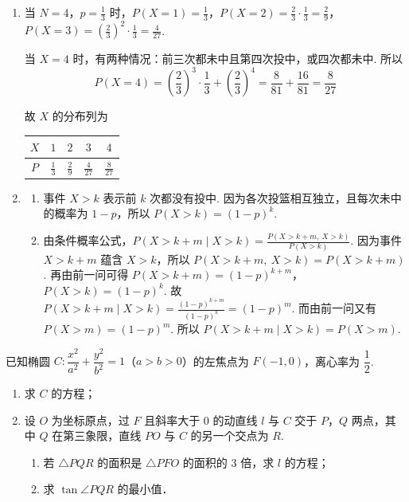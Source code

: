\documentclass[UTF8,a4paper,oneside,11pt]{ctexbook}
\begin{document}
\begin{solution}
\begin{enumerate}
\item 当 \(N=4\)，\(p=\frac{1}{3}\) 时，\(P\left( X=1 \right)=\frac{1}{3}\)，\(P\left( X=2 \right)=\frac{2}{3}\cdot \frac{1}{3}=\frac{2}{9}\)，\(P\left( X=3 \right)=\left( \frac{2}{3} \right)^2\cdot \frac{1}{3}=\frac{4}{27}\).

当 \(X=4\) 时，有两种情况：前三次都未中且第四次投中，或四次都未中. 所以
\[
P\left( X=4 \right)=\left( \frac{2}{3} \right)^3\cdot \frac{1}{3}+\left( \frac{2}{3} \right)^4=\frac{8}{81}+\frac{16}{81}=\frac{8}{27}
\]

故 \(X\) 的分布列为
{\centering
\begin{tabular}{c|cccc}
\(X\) & \(1\) & \(2\) & \(3\) & \(4\) \\
\hline
\(P\) & \(\frac{1}{3}\) & \(\frac{2}{9}\) & \(\frac{4}{27}\) & \(\frac{8}{27}\)
\end{tabular}
\par}

\item
\begin{enumerate}
\item 事件 \(X>k\) 表示前 \(k\) 次都没有投中. 因为各次投篮相互独立，且每次未中的概率为 \(1-p\)，所以 \(P\left( X>k \right)=\left( 1-p \right)^k\).

\item 由条件概率公式，\(P\left( X>k+m\mid X>k \right)=\frac{P\left( X>k+m,\ X>k \right)}{P\left( X>k \right)}\). 因为事件 \(X>k+m\) 蕴含 \(X>k\)，所以 \(P\left( X>k+m,\ X>k \right)=P\left( X>k+m \right)\). 再由前一问可得 \(P\left( X>k+m \right)=\left( 1-p \right)^{k+m}\)，\(P\left( X>k \right)=\left( 1-p \right)^k\). 故 \(P\left( X>k+m\mid X>k \right)=\frac{\left( 1-p \right)^{k+m}}{\left( 1-p \right)^k}=\left( 1-p \right)^m\). 而由前一问又有 \(P\left( X>m \right)=\left( 1-p \right)^m\). 所以 \(P\left( X>k+m\mid X>k \right)=P\left( X>m \right)\).
\end{enumerate}
\end{enumerate}
\end{solution}

\begin{problem}
已知椭圆 \(C:\dfrac{x^2}{a^2}+\dfrac{y^2}{b^2}=1\)（\(a>b>0\)）的左焦点为 \(F(-1,0)\)，离心率为 \(\dfrac{1}{2}\).

\begin{enumerate}
\item 求 \(C\) 的方程；
\item 设 \(O\) 为坐标原点，过 \(F\) 且斜率大于 \(0\) 的动直线 \(l\) 与 \(C\) 交于 \(P\)，\(Q\) 两点，其中 \(Q\) 在第三象限，直线 \(PO\) 与 \(C\) 的另一个交点为 \(R\).
\begin{enumerate}
\item 若 \(\triangle PQR\) 的面积是 \(\triangle PFO\) 的面积的 \(3\) 倍，求 \(l\) 的方程；
\item 求 \(\tan \angle PQR\) 的最小值．
\end{enumerate}
\end{enumerate}
\end{problem}
\end{document}
